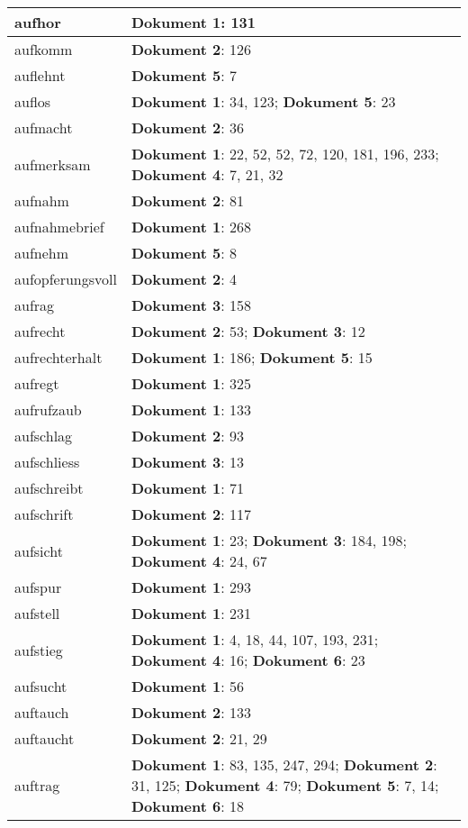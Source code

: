 \documentclass[a5paper]{article}
\begin{document}
\begin{longtable}[l]{|l|p{3in}|}
\hline
aufhor & \textbf{Dokument 1}: 131 \\
\hline
aufkomm & \textbf{Dokument 2}: 126 \\
\hline
auflehnt & \textbf{Dokument 5}: 7 \\
\hline
auflos & \textbf{Dokument 1}: 34, 123; \textbf{Dokument 5}: 23 \\
\hline
aufmacht & \textbf{Dokument 2}: 36 \\
\hline
aufmerksam & \textbf{Dokument 1}: 22, 52, 52, 72, 120, 181, 196, 233; \textbf{Dokument 4}: 7, 21, 32 \\
\hline
aufnahm & \textbf{Dokument 2}: 81 \\
\hline
aufnahmebrief & \textbf{Dokument 1}: 268 \\
\hline
aufnehm & \textbf{Dokument 5}: 8 \\
\hline
aufopferungsvoll & \textbf{Dokument 2}: 4 \\
\hline
aufrag & \textbf{Dokument 3}: 158 \\
\hline
aufrecht & \textbf{Dokument 2}: 53; \textbf{Dokument 3}: 12 \\
\hline
aufrechterhalt & \textbf{Dokument 1}: 186; \textbf{Dokument 5}: 15 \\
\hline
aufregt & \textbf{Dokument 1}: 325 \\
\hline
aufrufzaub & \textbf{Dokument 1}: 133 \\
\hline
aufschlag & \textbf{Dokument 2}: 93 \\
\hline
aufschliess & \textbf{Dokument 3}: 13 \\
\hline
aufschreibt & \textbf{Dokument 1}: 71 \\
\hline
aufschrift & \textbf{Dokument 2}: 117 \\
\hline
aufsicht & \textbf{Dokument 1}: 23; \textbf{Dokument 3}: 184, 198; \textbf{Dokument 4}: 24, 67 \\
\hline
aufspur & \textbf{Dokument 1}: 293 \\
\hline
aufstell & \textbf{Dokument 1}: 231 \\
\hline
aufstieg & \textbf{Dokument 1}: 4, 18, 44, 107, 193, 231; \textbf{Dokument 4}: 16; \textbf{Dokument 6}: 23 \\
\hline
aufsucht & \textbf{Dokument 1}: 56 \\
\hline
auftauch & \textbf{Dokument 2}: 133 \\
\hline
auftaucht & \textbf{Dokument 2}: 21, 29 \\
\hline
auftrag & \textbf{Dokument 1}: 83, 135, 247, 294; \textbf{Dokument 2}: 31, 125; \textbf{Dokument 4}: 79; \textbf{Dokument 5}: 7, 14; \textbf{Dokument 6}: 18 \\

\end{longtable}
\end{document}

